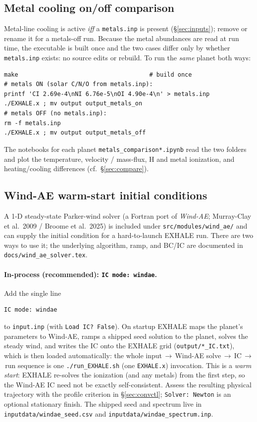 \documentclass[english,a4paper]{my_memo}
\begin{document}
\subsection{Metal cooling on/off comparison}
Metal-line cooling is active \emph{iff} a \texttt{metals.inp} is present
(\S\ref{sec:inputs}); remove or rename it for a metals-off run. Because the metal
abundances are read at run time, the executable is built once and the two cases
differ only by whether \texttt{metals.inp} exists: no source edits or rebuild.
To run the \emph{same} planet both ways:
\begin{lstlisting}[style=sh]
make                                     # build once
# metals ON (solar C/N/O from metals.inp):
printf 'CI 2.69e-4\nNI 6.76e-5\nOI 4.90e-4\n' > metals.inp
./EXHALE.x ; mv output output_metals_on
# metals OFF (no metals.inp):
rm -f metals.inp
./EXHALE.x ; mv output output_metals_off
\end{lstlisting}
The notebooks for each planet \texttt{metals\_comparison*.ipynb} read the two folders and
plot the temperature, velocity / mass-flux, H and metal ionization, and
heating/cooling differences (cf.\ \S\ref{sec:compare}).

\subsection{Wind-AE warm-start initial conditions}\label{sec:windae}
A 1-D steady-state Parker-wind solver (a Fortran port of \emph{Wind-AE};
Murray-Clay et al.\ 2009 / Broome et al.\ 2025) is included under
\texttt{src/modules/wind\_ae/} and can supply the initial condition for a
hard-to-launch EXHALE run. There are two ways to use it; the underlying
algorithm, ramp, and BC/IC are documented in \texttt{docs/wind\_ae\_solver.tex}.

\paragraph{In-process (recommended): \texttt{IC mode: windae}.}
Add the single line
\begin{lstlisting}[style=cfg]
IC mode: windae
\end{lstlisting}
to \texttt{input.inp} (with \texttt{Load IC?\ False}). On startup EXHALE
maps the planet's parameters to Wind-AE, ramps a shipped seed solution to
the planet, solves the steady wind, and writes the IC onto the EXHALE grid
(\texttt{output/*\_IC.txt}), which is then loaded automatically: the
whole input\,$\to$\,Wind-AE solve\,$\to$\,IC\,$\to$\,run sequence is one
\texttt{./run\_EXHALE.sh} (one \texttt{EXHALE.x}) invocation. This is a
\emph{warm start}: EXHALE re-solves the ionization (and any metals) from
the first step, so the Wind-AE IC need not be exactly self-consistent.
Assess the resulting physical trajectory with the profile criterion in
\S\ref{sec:convctl}; \texttt{Solver: Newton} is an optional stationary
finish. The shipped seed and spectrum live in
\texttt{inputdata/windae\_seed.csv} and
\texttt{inputdata/windae\_spectrum.inp}.
\end{document}
